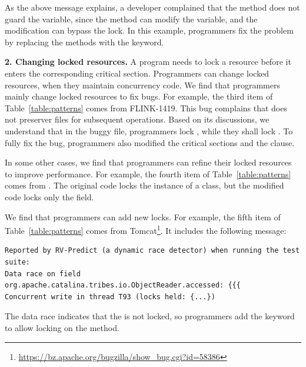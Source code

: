 As the above message explains, a developer complained that the  method does not guard the  variable, since the  method can modify the  variable, and the modification can bypass the lock. In this example, programmers fix the problem by replacing the methods with the  keyword.%



\noindent
\textbf{2. Changing locked resources.} A program needs to lock a resource before it enters the corresponding critical section. Programmers can change locked resources, when they maintain concurrency code. We find that programmers mainly change locked resources to fix bugs. For example, the third item of Table~\ref{table:patterns} comes from FLINK-1419. This bug complains that  does not preserver files for subsequent operations. Based on its discussions, we understand that in the buggy file, programmers lock , while they shall lock . To fully fix the bug, programmers also modified the critical sections and the  clause.


In some other cases, we find that programmers can refine their locked resources to improve performance. For example, the fourth item of Table~\ref{table:patterns} comes from . The original code locks the instance of a class, but the modified code locks only the  field.

We find that programmers can add new locks. For example, the fifth item of Table~\ref{table:patterns} comes from Tomcat\footnote{\url{https://bz.apache.org/bugzilla/show\_bug.cgi?id=58386}}. It includes the following message:

\begin{lstlisting}
Reported by RV-Predict (a dynamic race detector) when running the test suite:
Data race on field org.apache.catalina.tribes.io.ObjectReader.accessed: {{{
Concurrent write in thread T93 (locks held: {...})
\end{lstlisting}

The data race indicates that the  is not locked, so programmers add the  keyword to allow locking on the method.

